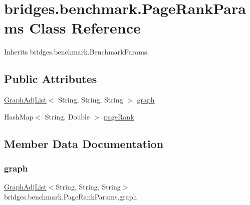 \hypertarget{classbridges_1_1benchmark_1_1_page_rank_params}{}\section{bridges.\+benchmark.\+Page\+Rank\+Params Class Reference}
\label{classbridges_1_1benchmark_1_1_page_rank_params}


Inherits bridges.\+benchmark.\+Benchmark\+Params.

\subsection*{Public Attributes}
\begin{DoxyCompactItemize}
\item 
\mbox{\hyperlink{classbridges_1_1base_1_1_graph_adj_list}{Graph\+Adj\+List}}$<$ String, String, String $>$ \mbox{\hyperlink{classbridges_1_1benchmark_1_1_page_rank_params_a5356d0005805dc3a9749e6e7a2659c49}{graph}}
\item 
Hash\+Map$<$ String, Double $>$ \mbox{\hyperlink{classbridges_1_1benchmark_1_1_page_rank_params_aaf852c1fecafa8ed2d222edea9246f7a}{page\+Rank}}
\end{DoxyCompactItemize}


\subsection{Member Data Documentation}
\mbox{\label{classbridges_1_1benchmark_1_1_page_rank_params_a5356d0005805dc3a9749e6e7a2659c49}} 
\subsubsection{\texorpdfstring{graph}{graph}}
{\footnotesize\ttfamily \mbox{\hyperlink{classbridges_1_1base_1_1_graph_adj_list}{Graph\+Adj\+List}}$<$String, String, String$>$ bridges.\+benchmark.\+Page\+Rank\+Params.\+graph}

\mbox{\label{classbridges_1_1benchmark_1_1_page_rank_params_aaf852c1fecafa8ed2d222edea9246f7a}} 

